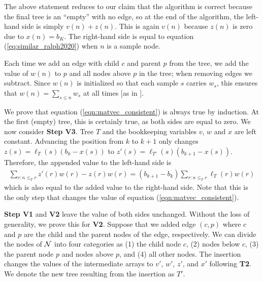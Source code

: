 The above statement reduces to our claim that the algorithm is correct because
the final tree is an ``empty'' with no edge,
so at the end of the algorithm, the left-hand side is simply $v(n)+z(n)$.
This is again $v(n)$ because $z(n)$ is zero due to $x(n)=b_K$.
The right-hand side is equal to equation (\ref{eq:similar_ralph2020}) when $n$ is a sample node.

Each time we add an edge with child $c$ and parent $p$ from the tree, we add the value of $w(n)$ to $p$ and all nodes above $p$ in the tree;
when removing edges we subtract.
Since $w(n)$ is initialized so that each sample $s$ carries $w_s$, this ensures that $w(n)= \sum_{s \le n} w_s$ at all times [as in \cite{kelleher2016efficient, ralph2020efficiently}].

We prove that equation  (\ref{eqn:matvec_consistent}) is always true by induction.
At the first (empty) tree, this is certainly true,
as both sides are equal to zero.
We now consider \textbf{Step V3}. 
Tree $T$ and the bookkeeping variables $v$, $w$ and $x$ are left constant.
Advancing the position from $k$ to $k+1$ only changes 
$z(s)=\ell_T(s) (b_k - x(s))$ to 
$z'(s)=\ell_{T'}(s) (b_{k+1} - x(s))$.
Therefore, the appended value to the left-hand side is
\begin{align}
    \sum_{r: n \le_T r}z'(r)w(r) - z(r)w(r) = (b_{k+1}-b_{k})
    \sum_{r: n \le_T r} \ell_T(r) w(r)
\end{align}
which is also equal to the added value to the right-hand side.
Note that this is the only step that changes the value of equation (\ref{eqn:matvec_consistent}).

\textbf{Step V1} and \textbf{V2} leave the value of both sides unchanged.
Without the loss of generality, we prove this for \textbf{V2}.
Suppose that we added edge $(c,p)$ where $c$ and $p$ are the child and the parent nodes of the edge, respectively.
We can divide the nodes of $\mathcal{N}$ into four categories as (1) the child node $c$, (2) nodes below $c$,  (3) the parent node $p$ and nodes above $p$, and (4) all other nodes. 
The insertion changes the values of the intermediate arrays to $v'$, $w'$, $z'$, and $x'$ following \textbf{T2}.
We denote the new tree resulting from the insertion as $T'$.

